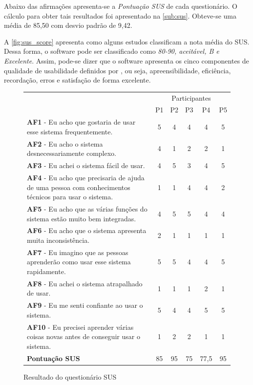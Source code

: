 Abaixo das afirmações apresenta-se a \textit{Pontuação SUS} de cada questionário. O cálculo
para obter tais resultados foi apresentado na \autoref{sub:sus}. Obteve-se uma média de
85,50 com desvio padrão de 9,42.

A \autoref{fig:sus_score} apresenta como alguns estudos classificam a nota média do SUS.
Dessa forma, o software pode ser classificado como \textit{80-90, aceitável, B e Excelente}.
Assim, pode-se dizer que o software apresenta os cinco componentes de qualidade de usabilidade definidos
por , ou seja, apreensibilidade, eficiência, recordação, erros e satisfação
de forma excelente.

\begin{figure}[!ht]
  \centering
  \caption{Resultado do questionário SUS}
  \label{tab:sus_result}
\begin{tabular}{>{\raggedright}p{0.45\paperwidth}||ccccc}
\hline
\multicolumn{6}{c}{\textbf{Resultado do questionário SUS}}\tabularnewline
\hline
\hline
\multirow{2}{0.5\paperwidth}{\centering{}\textbf{Afirmações}} & \multicolumn{5}{c}{Participantes}\tabularnewline
 & P1 & P2 & P3 & P4 & P5\tabularnewline
\hline
\hline
\textbf{AF1} - {\small{}Eu acho que gostaria de usar esse sistema frequentemente.}
 & 5 & 4 & 4 & 4 & 5\tabularnewline
\textbf{AF2} - {\small{}Eu acho o sistema desnecessariamente complexo.}
 & 4 & 1 & 2 & 2 & 1\tabularnewline
\textbf{AF3} - {\small{}Eu achei o sistema fácil de usar.}
 & 4 & 5 & 3 & 4 & 5\tabularnewline
\textbf{AF4} - {\small{}Eu acho que precisaria de ajuda de uma pessoa com conhecimentos
técnicos para usar o sistema.}
 & 1 & 1 & 4 & 4 & 2\tabularnewline
\textbf{AF5} - {\small{}Eu acho que as várias funções do sistema estão muito bem
integradas.}
 & 4 & 5 & 5 & 4 & 4\tabularnewline
\textbf{AF6} - {\small{}Eu acho que o sistema apresenta muita inconsistência.}
 & 2 & 1 & 1 & 1 & 1\tabularnewline
\textbf{AF7} - {\small{}Eu imagino que as pessoas aprenderão como usar esse sistema
rapidamente.}
 & 5 & 5 & 4 & 4 & 5\tabularnewline
\textbf{AF8} - {\small{}Eu achei o sistema atrapalhado de usar.}
 & 1 & 1 & 1 & 2 & 1\tabularnewline
\textbf{AF9} - {\small{}Eu me senti confiante ao usar o sistema.}
 & 5 & 4 & 4 & 5 & 5\tabularnewline
\textbf{AF10} - {\small{}Eu precisei aprender várias coisas novas antes de conseguir
usar o sistema.}
 & 1 & 2 & 2 & 1 & 1\tabularnewline
\hline
\centering{}\textbf{Pontuação SUS} & 85 & 95 & 75 & 77,5 & 95\tabularnewline
\hline
\end{tabular}
\doautor
\end{figure}

